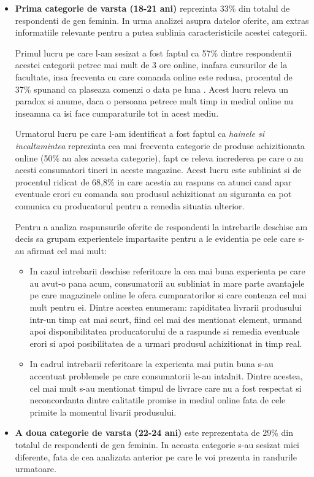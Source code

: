 \documentclass[a4paper, 12pt]{article}
\begin{document}
\newpage	
	\begin{itemize}
		\item \textbf{Prima categorie de varsta (18-21 ani)} reprezinta 33\% din totalul de respondenti de gen feminin. In  urma analizei asupra datelor oferite, am extras informatiile relevante pentru a putea sublinia caracteristicile acestei categorii. 
		
		\quad Primul lucru pe care l-am sesizat a fost faptul ca 57\% dintre respondentii acestei categorii petrec mai mult de 3 ore online, inafara cursurilor de la facultate, insa frecventa cu care comanda online este redusa, procentul de  37\% spunand ca plaseaza comenzi o data pe luna . Acest lucru releva un paradox si anume, daca o persoana petrece mult timp in mediul online nu inseamna ca isi face cumparaturile tot in acest mediu.
		
		\quad Urmatorul lucru pe care l-am identificat a fost faptul ca\textit{ hainele si incaltamintea} reprezinta cea mai frecventa categorie de produse achizitionata online (50\% au ales aceasta categorie),  fapt ce releva increderea pe care o au acesti consumatori tineri in aceste magazine. Acest lucru este subliniat si de procentul ridicat de 68,8\% in care acestia au raspuns ca atunci cand apar eventuale erori cu comanda sau produsul achizitionat au siguranta ca pot comunica cu producatorul pentru a remedia situatia ulterior. 
		
		\quad Pentru a analiza raspunsurile oferite de respondenti la intrebarile deschise am decis sa grupam experientele impartasite pentru a le evidentia pe cele care s-au afirmat cel mai mult:
		\begin{itemize}
			\item In cazul intrebarii deschise referitoare la cea mai buna experienta pe care au avut-o pana acum, consumatorii au subliniat in mare parte avantajele pe care magazinele online le ofera cumparatorilor si care conteaza cel mai mult pentru ei. Dintre acestea enumeram: rapiditatea livrarii produsului intr-un timp cat mai scurt, fiind cel mai des mentionat element, urmand apoi disponibilitatea producatorului de a raspunde si remedia eventuale erori si apoi posibilitatea de a urmari produsul achizitionat in timp real.
			\item 	In cadrul intrebarii referitoare la experienta mai putin buna s-au accentuat problemele pe care consumatorii le-au intalnit. Dintre acestea, cel mai mult s-au mentionat timpul de livrare care nu a fost respectat si neconcordanta dintre calitatile promise in mediul online fata de cele primite la momentul livarii produsului. 
		\end{itemize}
		\item \textbf{A doua categorie de varsta (22-24 ani)} este reprezentata de 29\% din totalul de respondenti de gen feminin. In aceasta categorie s-au sesizat mici diferente, fata de cea analizata anterior pe care le voi prezenta in randurile urmatoare.
		

\end{itemize}
\end{document}
